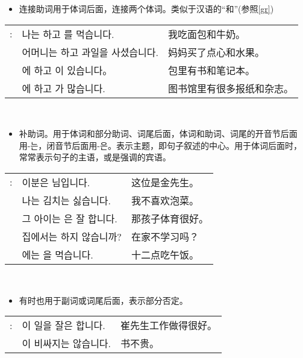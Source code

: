 \begin{grammar}
    \begin{grammarsect}[\kr -하고]
    \begin{itemize}
        \item 连接助词用于体词后面，连接两个体词。类似于汉语的“和”(参照\ref{gr})
    \end{itemize}
    \begin{tabular}{lll}
        \kr \ruby{例}{예}: &\kr 나는 \ruby{빵}{pão}하고 \ruby{牛乳}{우유}를 먹습니다.&我吃面包和牛奶。 \\
        &\kr 어머니는 \ruby{菓子}{과자}하고 과일을 사셨습니다. &妈妈买了点心和水果。\\ 
        &\kr \ruby{가방}{かばん}에 \ruby{冊}{책}하고 \ruby{空冊}{공책}이 있습니다。&包里有书和笔记本。\\
        &\kr \ruby{圖書館}{도서관}에 \ruby{新聞}{신문}하고 \ruby{雜誌}{잡지}가 많습니다.&图书馆里有很多报纸和杂志。\\
    \end{tabular}\\
    \end{grammarsect}
    \begin{grammarsect}[\kr -은/-는]
        \begin{itemize}
            \item 补助词。用于体词和部分助词、词尾后面，体词和助词、词尾的开音节后面用{\kr -는}，闭音节后面用{\kr -은}。表示主题，即句子叙述的中心。用于体词后面时，常常表示句子的主语，或是强调的宾语。
        \end{itemize}
        \begin{tabular}{lll}
            \kr \ruby{例}{예}: &\kr 이분은 \ruby{金}{김} \ruby{先生}{선생}님입니다.&这位是金先生。\\
            &\kr 나는 김치는 싫습니다.&我不喜欢泡菜。\\
            &\kr 그 아이는 \ruby{運動}{운동}은 잘 합니다.&那孩子体育很好。\\
            &\kr 집에서는 \ruby{工夫}{공부}하지 않습니까?&在家不学习吗？\\
            &\kr \ruby{12}{열두}\ruby{時}{시}에는 \ruby{點心}{점심}을 먹습니다.&十二点吃午饭。
        \end{tabular}\\
        \begin{itemize}
            \item 有时也用于副词或词尾后面，表示部分否定。
        \end{itemize}
        \begin{tabular}{lll}
            \kr \ruby{例}{예}: &\kr \ruby{崔}{최} \ruby{先生}{선생}이 일을 잘은 합니다.&崔先生工作做得很好。\\
            &\kr \ruby{冊}{책}이 비싸지는 않습니다.&书不贵。
        \end{tabular}\\
    \end{grammarsect}
\end{grammar}